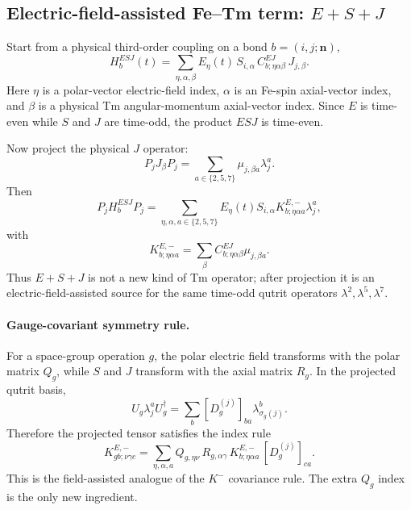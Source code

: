 \documentclass[11pt,a4paper]{article}
\newcommand{\ve}[1]{\boldsymbol{#1}}
\begin{document}
\subsection{Electric-field-assisted Fe--Tm term: $E+S+J$}

Start from a physical third-order coupling on a bond $b=(i,j;\ve n)$,
\begin{equation}
  \boxed{
  H^{ESJ}_{b}(t)
  =\sum_{\eta,\alpha,\beta}
  E_\eta(t)\,S_{i,\alpha}\,
  C^{EJ}_{b;\eta\alpha\beta}\,
  J_{j,\beta}.}
  \label{eq:ESJ-physical}
\end{equation}
Here $\eta$ is a polar-vector electric-field index, $\alpha$ is an Fe-spin axial-vector index, and $\beta$ is a physical Tm angular-momentum axial-vector index.  Since $E$ is time-even while $S$ and $J$ are time-odd, the product $E S J$ is time-even.

Now project the physical $J$ operator:
\begin{equation}
  P_jJ_{\beta}P_j=\sum_{a\in\{2,5,7\}}\mu_{j,\beta a}\lambda_j^a.
\end{equation}
Then
\begin{equation}
  P_jH^{ESJ}_{b}P_j
  =\sum_{\eta,\alpha,a\in\{2,5,7\}}
  E_\eta(t)S_{i,\alpha}
  K^{E,-}_{b;\eta\alpha a}\lambda_j^a,
  \label{eq:ESJ-projected}
\end{equation}
with
\begin{equation}
  \boxed{
  K^{E,-}_{b;\eta\alpha a}
  =\sum_{\beta}C^{EJ}_{b;\eta\alpha\beta}\mu_{j,\beta a}.}
  \label{eq:ESJ-K-projection}
\end{equation}
Thus $E+S+J$ is not a new kind of Tm operator; after projection it is an electric-field-assisted source for the same time-odd qutrit operators $\lambda^2,\lambda^5,\lambda^7$.

\paragraph{Gauge-covariant symmetry rule.}
For a space-group operation $g$, the polar electric field transforms with the polar matrix $Q_g$, while $S$ and $J$ transform with the axial matrix $R_g$.  In the projected qutrit basis,
\begin{equation}
  U_g\lambda_j^aU_g^\dagger
  =\sum_b\left[D_g^{(j)}\right]_{ba}\lambda_{\sigma_g(j)}^b.
\end{equation}
Therefore the projected tensor satisfies the index rule
\begin{equation}
  \boxed{
  K^{E,-}_{gb;\nu\gamma c}
  =\sum_{\eta,\alpha,a}
  Q_{g,\eta\nu}\,R_{g,\alpha\gamma}\,
  K^{E,-}_{b;\eta\alpha a}\,
  \left[D_g^{(j)}\right]_{ca}.}
  \label{eq:ESJ-covariance}
\end{equation}
This is the field-assisted analogue of the $K^-$ covariance rule.  The extra $Q_g$ index is the only new ingredient.
\end{document}
